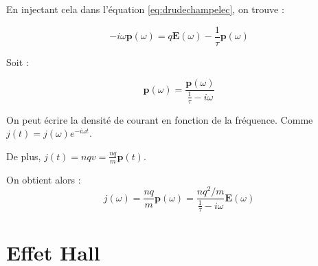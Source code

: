 En injectant cela dans l'équation \ref{eq:drudechampelec}, on trouve :

\begin{equation}
-i\omega \mathbf{p}(\omega) = q\mathbf{E}(\omega) - \frac{1}{\tau} \mathbf{p}(\omega) 
\end{equation}

Soit :

\begin{equation}
\mathbf{p}(\omega) = \frac{\mathbf{p}(\omega)}{\frac{1}{\tau}-i\omega}
\end{equation}

On peut écrire la densité de courant en fonction de la fréquence. Comme $j(t) = j(\omega) e^{-i\omega t}$.

De plus, $j(t) = nqv = \frac{nq}{m}\mathbf{p}(t)$.

On obtient alors :
\begin{equation}
j(\omega) = \frac{nq}{m}\mathbf{p}(\omega) = \frac{nq^2/m}{\frac{1}{\tau}-i\omega} \mathbf{E}(\omega)
\end{equation}

\TODO


\section{Effet Hall}
